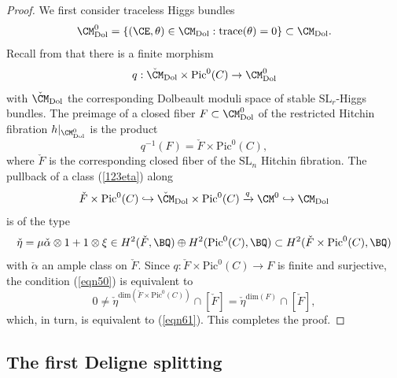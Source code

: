 \begin{proof}
We  first consider traceless Higgs bundles
\[
\CM^0_{\mathrm{Dol}} = \{(\CE, \theta) \in \CM_{\mathrm{Dol}}: \mathrm{trace}(\theta)=0\} \subset \CM_{\mathrm{Dol}}.
\]
Recall from \cite[Proposition 2.4.3]{dCHM1} that there is a finite morphism
\[
q: \check{\CM}_{\mathrm{Dol}} \times \mathrm{Pic}^0(C)   \to \CM^0_{\mathrm{Dol}}
\]
with $\check{\CM}_{\mathrm{Dol}}$ the corresponding Dolbeault  moduli  space of stable $\mathrm{SL}_r$-Higgs bundles. The preimage of a closed fiber $F \subset \CM^0_{\mathrm{Dol}}$ of the restricted Hitchin fibration $h|_{\CM^0_{\mathrm{Dol}}}$ is the product
\[
q^{-1}(F) =  \check{F} \times \mathrm{Pic}^0(C),
\]
where $\check{F}$ {is the corresponding  closed fiber} of the $\mathrm{SL}_n$ Hitchin fibration. The pullback of a class (\ref{123eta}) along
\[
\check{F} \times \mathrm{Pic}^0(C) \hookrightarrow \check{\CM}_{\mathrm{Dol}} \times \mathrm{Pic}^0(C)   \xrightarrow{q} \CM^0 \hookrightarrow \CM_{\mathrm{Dol}}
\]
is of the type
\[
\check{\eta} = \mu \check{\alpha}\otimes 1 + 1\otimes \xi \in H^2(\check{F}, \BQ) \oplus H^2(\mathrm{Pic}^0(C), \BQ) \subset H^2(\check{F} \times \mathrm{Pic}^0(C), \BQ)
\]
with $\check{\alpha}$ an ample class on $\check{F}$. Since $q: \check{F} \times \mathrm{Pic}^0(C) \to F$ is finite
{and surjective}, the condition (\ref{eqn50}) is equivalent to
\[
0 \neq \check{\eta}^{\mathrm{dim}(\check{F} \times \mathrm{Pic}^0(C))} \cap [\check{F}] = \check{\eta}^{\mathrm{dim}(F)}\cap [\check{F}],
\]
which, in turn,  is  equivalent to (\ref{eqn61}). This completes the proof.
\end{proof}

\subsection{The first Deligne splitting}\label{First Deligne Splitting}

